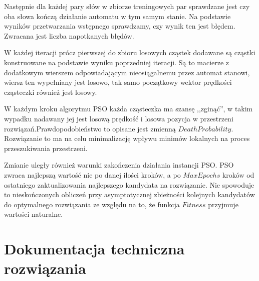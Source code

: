 \documentclass{../llncs_template_final/llncs}
\begin{document}
Następnie dla każdej pary słów w zbiorze treningowych par sprawdzane jest czy oba słowa kończą działanie automatu w tym samym stanie. Na podstawie wyników przetwarzania wstępnego sprawdzamy, czy wynik ten jest błędem. Zwracana jest liczba napotkanych błędów. 

W każdej iteracji prócz pierwszej do zbioru losowych cząstek dodawane są cząstki konstruowane na podstawie wyniku poprzedniej iteracji. Są to macierze z dodatkowym wierszem odpowiadającym nieosiągalnemu przez automat stanowi, wiersz ten wypełniany jest losowo, tak samo początkowy wektor prędkości cząsteczki również jest losowy.

W każdym kroku algorytmu PSO każda cząsteczka ma szansę ,,zginąć'', w takim wypadku nadawany jej jest losową prędkość i losowa pozycja w przestrzeni rozwiązań.Prawdopodobieństwo to opisane jest zmienną $DeathProbability$. Rozwiązanie to ma na celu minimalizację wpływu minimów lokalnych na proces przeszukiwania przestrzeni.

Zmianie uległy również warunki zakończenia działania instancji PSO. PSO zwraca najlepszą wartość nie po danej ilości kroków, a po $MaxEpochs$ kroków od ostatniego zaktualizowania najlepszego kandydata na rozwiązanie. Nie spowoduje to nieskończonych obliczeń przy asymptotycznej zbieżności kolejnych kandydatów do optymalnego rozwiązania ze względu na to, że funkcja $Fitness$ przyjmuje wartości naturalne.

\newpage

\section{Dokumentacja techniczna rozwiązania}

%
\end{document}
